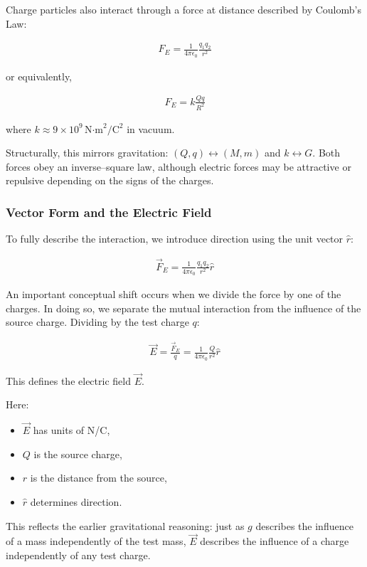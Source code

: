 \documentclass[12pt]{article}
\begin{document}
Charge particles also interact through a force at distance described by
Coulomb’s Law:

\begin{align*}
F_E = \frac{1}{4\pi\epsilon_0} \frac{q_1 q_2}{r^2}
\end{align*}

or equivalently,

\begin{align*}
F_E = k \frac{Q q}{R^2}
\end{align*}

where $k \approx 9 \times 10^9 \, \text{N·m}^2/\text{C}^2$ in vacuum.

Structurally, this mirrors gravitation:
$(Q, q) \leftrightarrow (M, m)$ and $k \leftrightarrow G$.
Both forces obey an inverse–square law, although electric forces may be
attractive or repulsive depending on the signs of the charges.

\subsubsection*{Vector Form and the Electric Field}

To fully describe the interaction, we introduce direction using the unit
vector $\hat{r}$:

\begin{align*}
\vec{F}_E =
\frac{1}{4\pi\epsilon_0}
\frac{q_1 q_2}{r^2} \hat{r}
\end{align*}

An important conceptual shift occurs when we divide the force by one of the
charges. In doing so, we separate the mutual interaction from the influence
of the source charge. Dividing by the test charge $q$:

\begin{align*}
\vec{E} = \frac{\vec{F}_E}{q}
= \frac{1}{4\pi\epsilon_0} \frac{Q}{r^2} \hat{r}
\end{align*}

This defines the electric field $\vec{E}$.

Here:
\begin{itemize}
  \item $\vec{E}$ has units of N/C,
  \item $Q$ is the source charge,
  \item $r$ is the distance from the source,
  \item $\hat{r}$ determines direction.
\end{itemize}

This reflects the earlier gravitational reasoning: just as $g$ describes the
influence of a mass independently of the test mass, $\vec{E}$ describes the
influence of a charge independently of any test charge.
\end{document}
